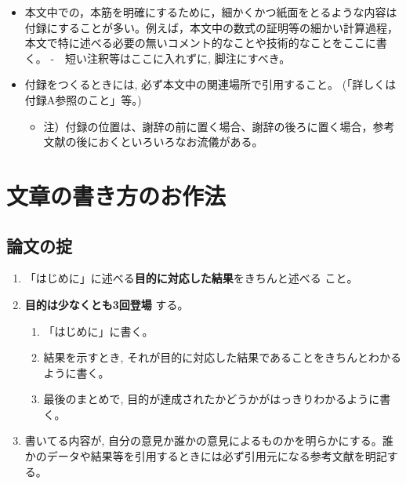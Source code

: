 \documentclass[12pt, ]{jsarticle}
\providecommand{\tightlist}{%
   \setlength{\itemsep}{0pt}\setlength{\parskip}{0pt}}
\begin{document}
\begin{itemize}
\tightlist
\item
  本文中での，本筋を明確にするために，細かくかつ紙面をとるような内容は付録にすることが多い。例えば，本文中の数式の証明等の細かい計算過程，本文で特に述べる必要の無いコメント的なことや技術的なことをここに書く。
  -　短い注釈等はここに入れずに, 脚注にすべき。
\item
  付録をつくるときには, 必ず本文中の関連場所で引用すること。
  (「詳しくは付録A参照のこと」等。)

  \begin{itemize}
  \tightlist
  \item
    注）付録の位置は、謝辞の前に置く場合、謝辞の後ろに置く場合，参考文献の後におくといろいろなお流儀がある。
  \end{itemize}
\end{itemize}

\hypertarget{ux6587ux7ae0ux306eux66f8ux304dux65b9ux306eux304aux4f5cux6cd5}{%
\section{文章の書き方のお作法}\label{ux6587ux7ae0ux306eux66f8ux304dux65b9ux306eux304aux4f5cux6cd5}}

\hypertarget{ux8ad6ux6587ux306eux639f}{%
\subsection{論文の掟}\label{ux8ad6ux6587ux306eux639f}}

\begin{enumerate}
\tightlist
\item
  「はじめに」に述べる\textbf{目的に対応した結果}をきちんと述べる こと。
\item
  \textbf{目的は少なくとも3回登場} する。

  \begin{enumerate}
  \tightlist
  \item
    「はじめに」に書く。
  \item
    結果を示すとき,
    それが目的に対応した結果であることをきちんとわかるように書く。
  \item
    最後のまとめで, 目的が達成されたかどうかがはっきりわかるように書く。
  \end{enumerate}
\item
  書いてる内容が,
  自分の意見か誰かの意見によるものかを明らかにする。誰かのデータや結果等を引用するときには必ず引用元になる参考文献を明記する。
\end{enumerate}
\end{document}
